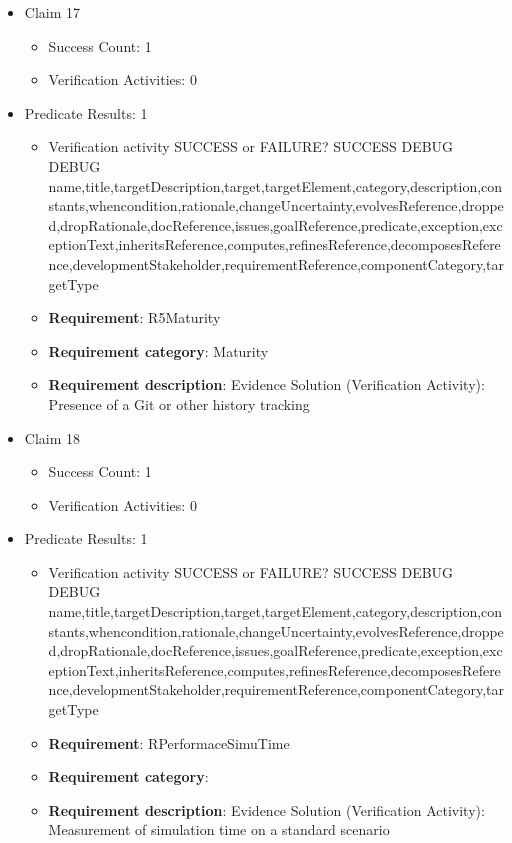 \documentclass{article}
\begin{document}
\begin{itemize}
  				  \item Claim 17
				\begin{itemize}
			    	\item Success Count: 1 
			    	\item Verification Activities: 0
				\end{itemize}
				
									    
				\item Predicate Results: 1
					\begin{itemize}				
					\item Verification activity SUCCESS or FAILURE? SUCCESS
					DEBUG DEBUG name,title,targetDescription,target,targetElement,category,description,constants,whencondition,rationale,changeUncertainty,evolvesReference,dropped,dropRationale,docReference,issues,goalReference,predicate,exception,exceptionText,inheritsReference,computes,refinesReference,decomposesReference,developmentStakeholder,requirementReference,componentCategory,targetType
					\item \textbf{Requirement}: R5Maturity 
					\item \textbf{Requirement category}: Maturity
					\item \textbf{Requirement description}: Evidence Solution (Verification Activity): Presence of a Git or other history tracking
					\end{itemize}

  				  \item Claim 18
				\begin{itemize}
			    	\item Success Count: 1 
			    	\item Verification Activities: 0
				\end{itemize}
				
									    
				\item Predicate Results: 1
					\begin{itemize}				
					\item Verification activity SUCCESS or FAILURE? SUCCESS
					DEBUG DEBUG name,title,targetDescription,target,targetElement,category,description,constants,whencondition,rationale,changeUncertainty,evolvesReference,dropped,dropRationale,docReference,issues,goalReference,predicate,exception,exceptionText,inheritsReference,computes,refinesReference,decomposesReference,developmentStakeholder,requirementReference,componentCategory,targetType
					\item \textbf{Requirement}: RPerformaceSimuTime 
					\item \textbf{Requirement category}: 
					\item \textbf{Requirement description}: Evidence Solution (Verification Activity): Measurement of simulation time on a standard scenario
					\end{itemize}


\end{itemize}
\end{document}
